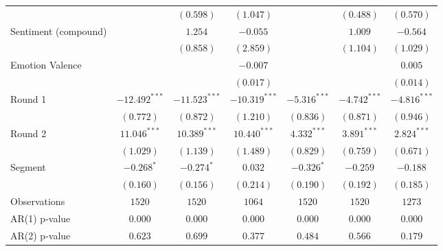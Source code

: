 \begin{adjustbox}{max width=\textwidth}
\begin{tabular}{l c c c c c c}
                                                  &                 & $(0.598)$       & $(1.047)$       &                & $(0.488)$      & $(0.570)$      \\
Sentiment (compound)                              &                 & $1.254$         & $-0.055$        &                & $1.009$        & $-0.564$       \\
                                                  &                 & $(0.858)$       & $(2.859)$       &                & $(1.104)$      & $(1.029)$      \\
Emotion Valence                                   &                 &                 & $-0.007$        &                &                & $0.005$        \\
                                                  &                 &                 & $(0.017)$       &                &                & $(0.014)$      \\
Round 1                                           & $-12.492^{***}$ & $-11.523^{***}$ & $-10.319^{***}$ & $-5.316^{***}$ & $-4.742^{***}$ & $-4.816^{***}$ \\
                                                  & $(0.772)$       & $(0.872)$       & $(1.210)$       & $(0.836)$      & $(0.871)$      & $(0.946)$      \\
Round 2                                           & $11.046^{***}$  & $10.389^{***}$  & $10.440^{***}$  & $4.332^{***}$  & $3.891^{***}$  & $2.824^{***}$  \\
                                                  & $(1.029)$       & $(1.139)$       & $(1.489)$       & $(0.829)$      & $(0.759)$      & $(0.671)$      \\
Segment                                           & $-0.268^{*}$    & $-0.274^{*}$    & $0.032$         & $-0.326^{*}$   & $-0.259$       & $-0.188$       \\
                                                  & $(0.160)$       & $(0.156)$       & $(0.214)$       & $(0.190)$      & $(0.192)$      & $(0.185)$      \\
\midrule
Observations                                      & $1520$          & $1520$          & $1064$          & $1520$         & $1520$         & $1273$         \\
AR(1) p-value                                     & $0.000$         & $0.000$         & $0.000$         & $0.000$        & $0.000$        & $0.000$        \\
AR(2) p-value                                     & $0.623$         & $0.699$         & $0.377$         & $0.484$        & $0.566$        & $0.179$        \\

\end{tabular}
\end{adjustbox}
